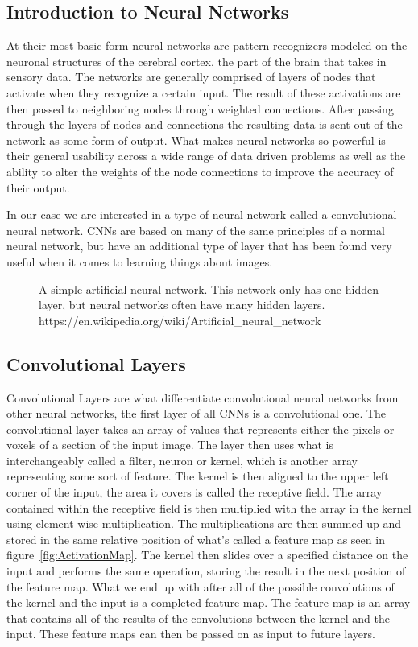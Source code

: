 \documentclass{sig-alternate}
\begin{document}
\subsection{Introduction to Neural Networks}
\label{sec:introNeuralNetworks}

At their most basic form neural networks are pattern recognizers modeled on the neuronal structures of the cerebral cortex, the part of the brain that takes in sensory data. The networks are generally comprised of layers of nodes that activate when they recognize a certain input. The result of these activations are then passed to neighboring nodes through weighted connections. After passing through the layers of nodes and connections the resulting data is sent out of the network as some form of output. What makes neural networks so powerful is their general usability across a wide range of data driven problems as well as the ability to alter the weights of the node connections to improve the accuracy of their output.

In our case we are interested in a type of neural network called a convolutional neural network. CNNs are based on many of the same principles of a normal neural network, but have an additional type of layer that has been found very useful when it comes to learning things about images.

\begin{figure}
\centering
{}
\caption{A simple artificial neural network. This network only has one hidden layer, but neural networks often have many hidden layers. https://en.wikipedia.org/wiki/Artificial\_neural\_network}
\label{fig:ANN}
\end{figure}

\subsection{Convolutional Layers}
\label{sec:convolutionalLayers}

Convolutional Layers are what differentiate convolutional neural networks from other neural networks, the first layer of all CNNs is a convolutional one. The convolutional layer takes an array of values that represents either the pixels or voxels of a section of the input image. The layer then uses what is interchangeably called a filter, neuron or kernel, which is another array representing some sort of feature. The kernel is then aligned to the upper left corner of the input, the area it covers is called the receptive field. The array contained within the receptive field is then multiplied with the array in the kernel using element-wise multiplication. The multiplications are then summed up and stored in the same relative position of what's called a feature map as seen in figure~\ref{fig:ActivationMap}. The kernel then slides over a specified distance on the input and performs the same operation, storing the result in the next position of the feature map. What we end up with after all of the possible convolutions of the kernel and the input is a completed feature map. The feature map is an array that contains all of the results of the convolutions between the kernel and the input. These feature maps can then be passed on as input to future layers.
\end{document}

